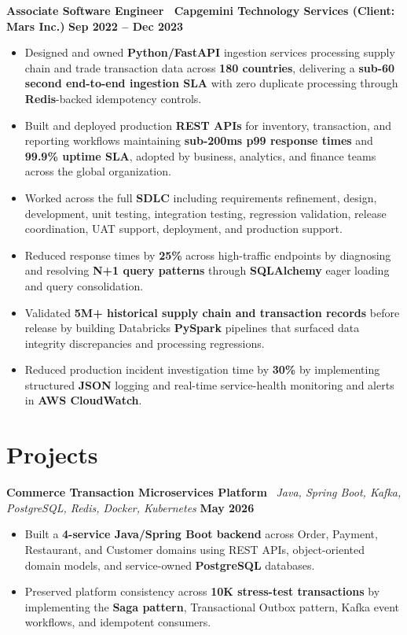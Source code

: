 \documentclass[10pt,letterpaper]{article}
\begin{document}
\textbf{Associate Software Engineer \textbar\
Capgemini Technology Services (Client: Mars Inc.)}
\hfill \textbf{Sep 2022 -- Dec 2023}
\begin{itemize}
  \item Designed and owned \textbf{Python/FastAPI} ingestion services processing
  supply chain and trade transaction data across \textbf{180 countries},
  delivering a \textbf{sub-60 second end-to-end ingestion SLA} with zero
  duplicate processing through \textbf{Redis}-backed idempotency controls.
  \item Built and deployed production \textbf{REST APIs} for inventory,
  transaction, and reporting workflows maintaining \textbf{sub-200ms p99
  response times} and \textbf{99.9\% uptime SLA}, adopted by business,
  analytics, and finance teams across the global organization.
  \item Worked across the full \textbf{SDLC} including requirements refinement,
  design, development, unit testing, integration testing, regression validation,
  release coordination, UAT support, deployment, and production support.
  \item Reduced response times by \textbf{25\%} across high-traffic endpoints
  by diagnosing and resolving \textbf{N+1 query patterns} through
  \textbf{SQLAlchemy} eager loading and query consolidation.
  \item Validated \textbf{5M+ historical supply chain and transaction records}
  before release by building Databricks \textbf{PySpark} pipelines that
  surfaced data integrity discrepancies and processing regressions.
  \item Reduced production incident investigation time by \textbf{30\%}
  by implementing structured \textbf{JSON} logging and real-time
  service-health monitoring and alerts in \textbf{AWS CloudWatch}.
\end{itemize}
\vspace{2pt}

\section*{Projects}
\textbf{Commerce Transaction Microservices Platform}
\textbar\ \textit{Java, Spring Boot, Kafka, PostgreSQL, Redis, Docker, Kubernetes}
\hfill \textbf{May 2026}
\begin{itemize}
  \item Built a \textbf{4-service Java/Spring Boot backend} across Order,
  Payment, Restaurant, and Customer domains using REST APIs, object-oriented
  domain models, and service-owned \textbf{PostgreSQL} databases.
  \item Preserved platform consistency across
  \textbf{10K stress-test transactions} by implementing the
  \textbf{Saga pattern}, Transactional Outbox pattern, Kafka event workflows,
  and idempotent consumers.
\end{itemize}
\vspace{2pt}
\end{document}
